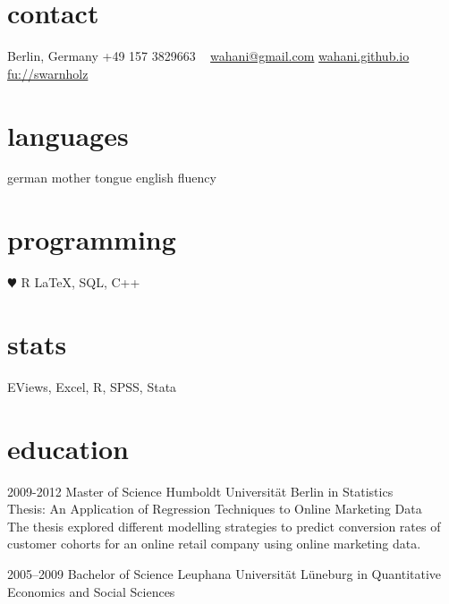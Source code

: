 \documentclass[]{friggeri-cv} %
\begin{document}


\begin{aside} %
\section{contact}
Berlin, Germany
+49 157 3829663
~
\href{mailto:wahani@gmail.com}{wahani@gmail.com}
\href{http://wahani.github.io/}{wahani.github.io}
\href{http://www.wiwiss.fu-berlin.de/fachbereich/vwl/Schmid/Team/Warnholz.html}{fu://swarnholz}
\section{languages}
german mother tongue
english fluency
\section{programming}
{\color{red} $\varheartsuit$} R
\LaTeX, SQL, C++
\section{stats}
EViews, Excel, R, 
SPSS, Stata
\end{aside}


\section{education}

\begin{entrylist}


\entry
{2009-2012}
{Master {\normalfont of Science}}
{Humboldt Universit\"at Berlin}
{in Statistics \\ Thesis: An Application of Regression Techniques to Online Marketing Data \\ The thesis explored different modelling strategies to predict conversion rates of customer cohorts for an online retail company using online marketing data.}


\entry
{2005--2009}
{Bachelor {\normalfont of Science}}
{Leuphana Universit\"at L\"uneburg}
{in Quantitative Economics and Social Sciences}


\end{entrylist}
\end{document}
